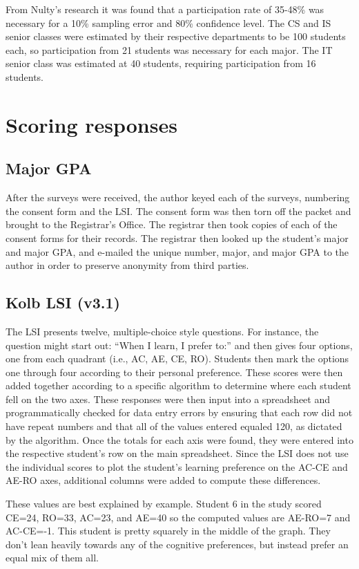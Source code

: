 From Nulty's research it was found that a participation rate of 35-48\% was necessary for a 10\% sampling error and 80\% confidence level. The CS and IS senior classes were estimated by their respective departments to be 100 students each, so participation from 21 students was necessary for each major. The IT senior class was estimated at 40 students, requiring participation from 16 students.

\section{Scoring responses}
\subsection{Major GPA}
After the surveys were received, the author keyed each of the surveys, numbering the consent form and the LSI. The consent form was then torn off the packet and brought to the Registrar's Office. The registrar then took copies of each of the consent forms for their records. The registrar then looked up the student's major and major GPA, and e-mailed the unique number, major, and major GPA to the author in order to preserve anonymity from third parties.

\subsection{Kolb LSI (v3.1)}
The LSI presents twelve, multiple-choice style questions. For instance, the question might start out: ``When I learn, I prefer to:'' and then gives four options, one from each quadrant (i.e., AC, AE, CE, RO). Students then mark the options one through four according to their personal preference. These scores were then added together according to a specific algorithm to determine where each student fell on the two axes. These responses were then input into a spreadsheet and programmatically checked for data entry errors by ensuring that each row did not have repeat numbers and that all of the values entered equaled 120, as dictated by the algorithm. Once the totals for each axis were found, they were entered into the respective student's row on the main spreadsheet. Since the LSI does not use the individual scores to plot the student's learning preference on the AC-CE and AE-RO axes, additional columns were added to compute these differences.

These values are best explained by example. Student 6 in the study scored CE=24, RO=33, AC=23, and AE=40 so the computed values are AE-RO=7 and AC-CE=-1. This student is pretty squarely in the middle of the graph. They don't lean heavily towards any of the cognitive preferences, but instead prefer an equal mix of them all.


